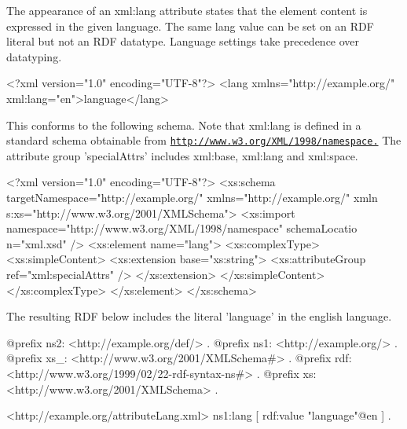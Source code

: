 The appearance of an xml:lang attribute states that the element content is expressed in the given language. The same lang value can be set on an RDF literal but not an RDF datatype. Language settings take precedence over datatyping.


\begin{DoxyCodeInclude}
<?xml version="1.0" encoding="UTF-8"?>
<lang xmlns="http://example.org/" xml:lang="en">language</lang>
\end{DoxyCodeInclude}


This conforms to the following schema. Note that xml:lang is defined in a standard schema obtainable from \href{http://www.w3.org/XML/1998/namespace.}{\tt http://www.w3.org/XML/1998/namespace.} The attribute group 'specialAttrs' includes xml:base, xml:lang and xml:space.


\begin{DoxyCodeInclude}
<?xml version="1.0" encoding="UTF-8"?>
<xs:schema targetNamespace="http://example.org/" xmlns="http://example.org/" xmln
      s:xs="http://www.w3.org/2001/XMLSchema">
        <xs:import namespace="http://www.w3.org/XML/1998/namespace" schemaLocatio
      n="xml.xsd" />
        <xs:element name="lang">
                <xs:complexType>
                        <xs:simpleContent>
                                <xs:extension base="xs:string">
                                        <xs:attributeGroup ref="xml:specialAttrs"
      />
                                </xs:extension>
                        </xs:simpleContent>
                </xs:complexType>
        </xs:element>
</xs:schema>
\end{DoxyCodeInclude}


The resulting RDF below includes the literal 'language' in the english language.


\begin{DoxyCodeInclude}
@prefix ns2:     <http://example.org/def/> .
@prefix ns1:     <http://example.org/> .
@prefix xs_:     <http://www.w3.org/2001/XMLSchema#> .
@prefix rdf:     <http://www.w3.org/1999/02/22-rdf-syntax-ns#> .
@prefix xs:      <http://www.w3.org/2001/XMLSchema> .

<http://example.org/attributeLang.xml>
      ns1:lang
              [ rdf:value "language"@en
              ] .
\end{DoxyCodeInclude}
 